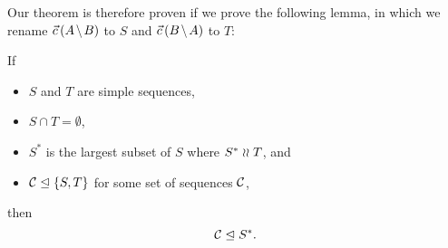 Our theorem is therefore proven if we prove the following lemma,
in which we rename $\amb$ to $S$ and $\bma$ to $T$:
\newcommand{\condSimple}{(c1)}
\newcommand{\condDisj}{(c2)}
\newcommand{\condApr}{(c3)}
\newcommand{\condWork}{(c4)}
\begin{mylem}\label{reconciliation_correct_part}
If
   \begin{itemize}
   \item[\condSimple] $S$ and $T$ are simple sequences,
   \item[\condDisj] $S\cap T=\emptyset$,
   \item[\condApr] $S^*$ is the largest subset of $S$ where $S^*\mathrel{\wr\wr} T$, and
   \item[\condWork] ${\mathcal{C}}\trianglelefteq{\{{S,T}\}}$ for some set of sequences $\mathcal{C}$,
   \end{itemize}
then
\[ {\mathcal{C}}\trianglelefteq{S^*}. \]
\end{mylem}

